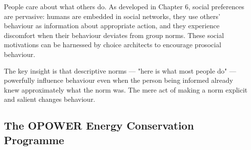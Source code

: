 \documentclass[12pt, letterpaper]{article}
\begin{document}
People care about what others do. As developed in Chapter 6, social preferences are pervasive: humans are embedded in social networks, they use others' behaviour as information about appropriate action, and they experience discomfort when their behaviour deviates from group norms. These social motivations can be harnessed by choice architects to encourage prosocial behaviour.

The key insight is that descriptive norms --- "here is what most people do" --- powerfully influence behaviour even when the person being informed already knew approximately what the norm was. The mere act of making a norm explicit and salient changes behaviour.


\subsection{The OPOWER Energy Conservation Programme}
\end{document}
